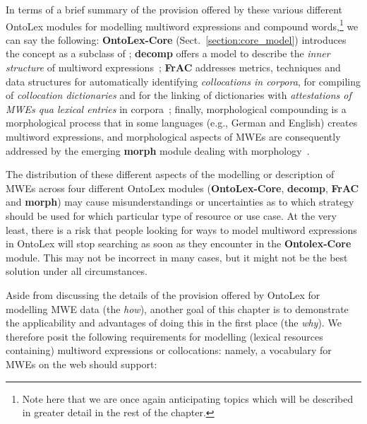 \documentclass[output=paper,colorlinks,citecolor=brown]{langscibook}
\begin{document}
In terms of a brief summary of the provision offered by these various different OntoLex modules for modelling multiword expressions and compound words,\footnote{Note here that we are once again anticipating topics which will be described in greater detail in the rest of the chapter.} we can say the following: \textbf{OntoLex-Core }(Sect.\ \ref{section:core_model}) introduces the concept  as a subclass of ; \textbf{decomp} offers a model to describe the \textit{inner structure} of multiword expressions~\citep{mccrae2016representing}; \textbf{FrAC} addresses metrics, techniques and data structures for automatically identifying \textit{collocations in corpora}, for compiling of \textit{collocation dictionaries} and for the linking of dictionaries with \textit{attestations of MWEs \op qua lexical entries\cp} in corpora~\citep{chiarcos2022modelling,chiarcos2022modellingGlobalex};  finally, morphological compounding is a morphological process that in some languages (e.g., German and English) creates multiword expressions, and morphological aspects of MWEs are consequently addressed by the emerging \textbf{morph} module dealing with morphology~\citep{chiarcos2022computational}.

The distribution of these different aspects of the modelling or description of MWEs across four different OntoLex modules (\textbf{OntoLex-Core}, \textbf{decomp}, \textbf{FrAC} and \textbf{morph}) may cause misunderstandings or uncertainties as to which strategy should be used for which particular type of resource or use case. At the very least, there is a risk that people looking for ways to model multiword expressions in OntoLex will stop searching as soon as they encounter  in the \textbf{Ontolex-Core} module. This may not be incorrect in many cases, but it might not be the best solution under all circumstances. %


Aside from discussing the details of the provision offered by OntoLex for modelling MWE data (the \textit{how}), another goal of this chapter is to demonstrate the applicability and advantages of doing this in the first place (the \textit{why}). We therefore posit the following requirements for modelling (lexical resources containing) multiword expressions or collocations: namely, a vocabulary for MWEs on the web should support:

\end{document}
